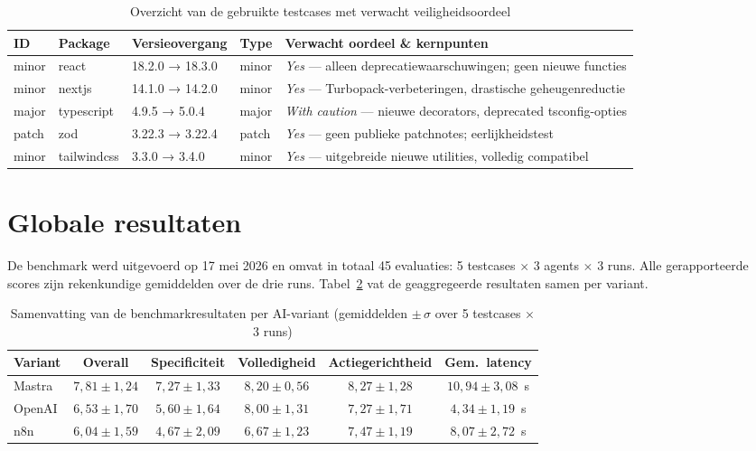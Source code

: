\begin{table}[H]
    \centering
    \small
    \begin{tabular}{p{1.2cm} p{2.0cm} p{3.0cm} p{1.2cm} p{6.0cm}}
        \hline
        \textbf{ID} & \textbf{Package} & \textbf{Versieovergang} & \textbf{Type} & \textbf{Verwacht oordeel \& kernpunten} \\
        \hline
        minor & react & 18.2.0 → 18.3.0 & minor & \textit{Yes} — alleen deprecatiewaarschuwingen; geen nieuwe functies \\
        minor & nextjs & 14.1.0 → 14.2.0 & minor & \textit{Yes} — Turbopack-verbeteringen, drastische geheugenreductie \\
        major & typescript & 4.9.5 → 5.0.4 & major & \textit{With caution} — nieuwe decorators, deprecated tsconfig-opties \\
        patch & zod & 3.22.3 → 3.22.4 & patch & \textit{Yes} — geen publieke patchnotes; eerlijkheidstest \\
        minor & tailwindcss & 3.3.0 → 3.4.0 & minor & \textit{Yes} — uitgebreide nieuwe utilities, volledig compatibel \\
        \hline
    \end{tabular}
    \caption{Overzicht van de gebruikte testcases met verwacht veiligheidsoordeel}
    \label{tab:testcases}
\end{table}

\section{Globale resultaten}
\label{sec:globale-resultaten}

De benchmark werd uitgevoerd op 17 mei 2026 en omvat in totaal 45 evaluaties: 5 testcases $\times$ 3 agents $\times$ 3 runs. Alle gerapporteerde scores zijn rekenkundige gemiddelden over de drie runs. Tabel~\ref{tab:benchmarkresultaten} vat de geaggregeerde resultaten samen per variant.

\begin{table}[H]
    \centering
    \begin{tabular}{lccccc}
        \hline
        \textbf{Variant} & \textbf{Overall} & \textbf{Specificiteit} & \textbf{Volledigheid} & \textbf{Actiegerichtheid} & \textbf{Gem.\ latency} \\
        \hline
        Mastra  & $7{,}81 \pm 1{,}24$ & $7{,}27 \pm 1{,}33$ & $8{,}20 \pm 0{,}56$ & $8{,}27 \pm 1{,}28$ & $10{,}94 \pm 3{,}08$~s \\
        OpenAI  & $6{,}53 \pm 1{,}70$ & $5{,}60 \pm 1{,}64$ & $8{,}00 \pm 1{,}31$ & $7{,}27 \pm 1{,}71$ & $4{,}34 \pm 1{,}19$~s \\
        n8n     & $6{,}04 \pm 1{,}59$ & $4{,}67 \pm 2{,}09$ & $6{,}67 \pm 1{,}23$ & $7{,}47 \pm 1{,}19$ & $8{,}07 \pm 2{,}72$~s  \\
        \hline
    \end{tabular}
    \caption{Samenvatting van de benchmarkresultaten per AI-variant (gemiddelden $\pm\,\sigma$ over 5 testcases $\times$ 3 runs)}
    \label{tab:benchmarkresultaten}
\end{table}

